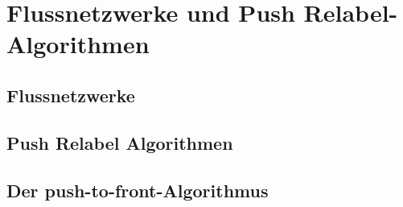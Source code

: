 \chapter{Flussnetzwerke und Push Relabel-Algorithmen}
\label{ch:flussnetze}

\section{Flussnetzwerke}

\section{Push Relabel Algorithmen}

\section{Der push-to-front-Algorithmus}